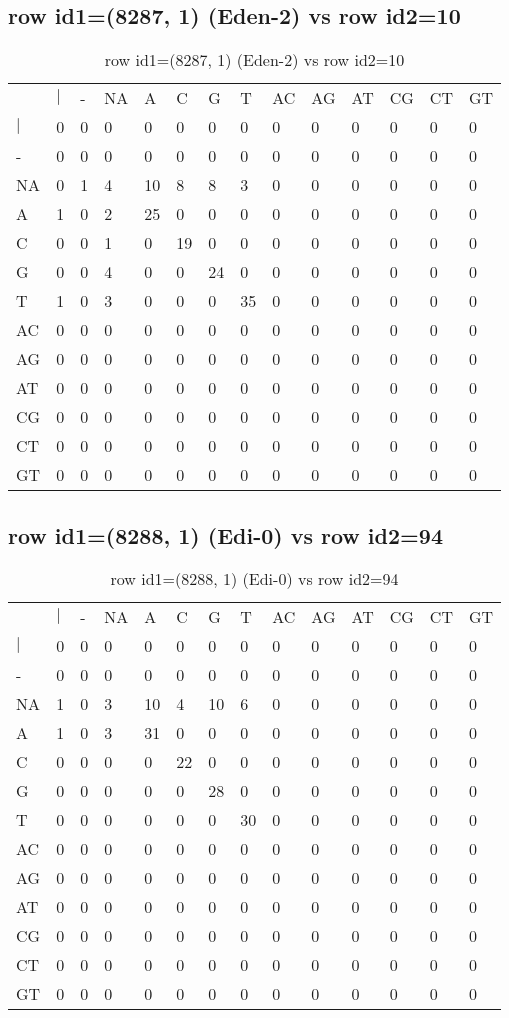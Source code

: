 \subsection{row id1=(8287, 1) (Eden-2) vs row id2=10}
\begin{center}
\begin{longtable}{|l|l|l|l|l|l|l|l|l|l|l|l|l|l|}
\caption{row id1=(8287, 1) (Eden-2) vs row id2=10} \label{table_dm258}\\
\hline
\\
\hline
&$|$&-&NA&A&C&G&T&AC&AG&AT&CG&CT&GT\\
$|$&0&0&0&0&0&0&0&0&0&0&0&0&0\\
-&0&0&0&0&0&0&0&0&0&0&0&0&0\\
NA&0&1&4&10&8&8&3&0&0&0&0&0&0\\
A&1&0&2&25&0&0&0&0&0&0&0&0&0\\
C&0&0&1&0&19&0&0&0&0&0&0&0&0\\
G&0&0&4&0&0&24&0&0&0&0&0&0&0\\
T&1&0&3&0&0&0&35&0&0&0&0&0&0\\
AC&0&0&0&0&0&0&0&0&0&0&0&0&0\\
AG&0&0&0&0&0&0&0&0&0&0&0&0&0\\
AT&0&0&0&0&0&0&0&0&0&0&0&0&0\\
CG&0&0&0&0&0&0&0&0&0&0&0&0&0\\
CT&0&0&0&0&0&0&0&0&0&0&0&0&0\\
GT&0&0&0&0&0&0&0&0&0&0&0&0&0\\
\hline
\end{longtable}
\end{center}

\subsection{row id1=(8288, 1) (Edi-0) vs row id2=94}
\begin{center}
\begin{longtable}{|l|l|l|l|l|l|l|l|l|l|l|l|l|l|}
\caption{row id1=(8288, 1) (Edi-0) vs row id2=94} \label{table_dm260}\\
\hline
\\
\hline
&$|$&-&NA&A&C&G&T&AC&AG&AT&CG&CT&GT\\
$|$&0&0&0&0&0&0&0&0&0&0&0&0&0\\
-&0&0&0&0&0&0&0&0&0&0&0&0&0\\
NA&1&0&3&10&4&10&6&0&0&0&0&0&0\\
A&1&0&3&31&0&0&0&0&0&0&0&0&0\\
C&0&0&0&0&22&0&0&0&0&0&0&0&0\\
G&0&0&0&0&0&28&0&0&0&0&0&0&0\\
T&0&0&0&0&0&0&30&0&0&0&0&0&0\\
AC&0&0&0&0&0&0&0&0&0&0&0&0&0\\
AG&0&0&0&0&0&0&0&0&0&0&0&0&0\\
AT&0&0&0&0&0&0&0&0&0&0&0&0&0\\
CG&0&0&0&0&0&0&0&0&0&0&0&0&0\\
CT&0&0&0&0&0&0&0&0&0&0&0&0&0\\
GT&0&0&0&0&0&0&0&0&0&0&0&0&0\\
\hline
\end{longtable}
\end{center}

